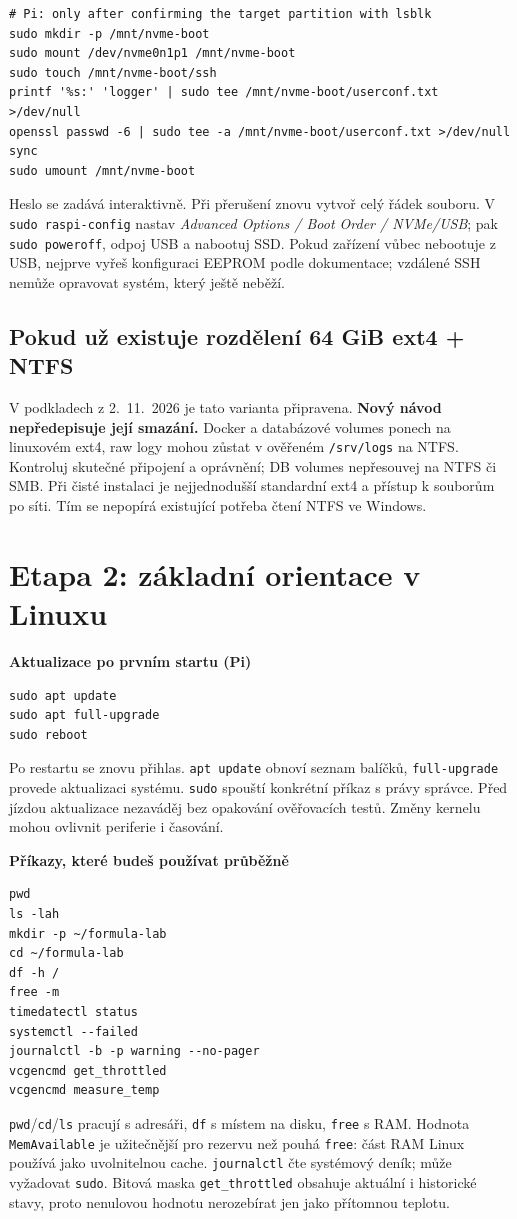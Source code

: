 \documentclass[11pt,a4paper]{article}
\newcommand{\krok}[1]{\par\noindent\textbf{#1}\par}
\begin{document}
\begin{lstlisting}
# Pi: only after confirming the target partition with lsblk
sudo mkdir -p /mnt/nvme-boot
sudo mount /dev/nvme0n1p1 /mnt/nvme-boot
sudo touch /mnt/nvme-boot/ssh
printf '%s:' 'logger' | sudo tee /mnt/nvme-boot/userconf.txt >/dev/null
openssl passwd -6 | sudo tee -a /mnt/nvme-boot/userconf.txt >/dev/null
sync
sudo umount /mnt/nvme-boot
\end{lstlisting}
Heslo se zadává interaktivně. Při přerušení znovu vytvoř celý řádek souboru. V \texttt{sudo raspi-config} nastav \emph{Advanced Options / Boot Order / NVMe/USB}; pak \texttt{sudo poweroff}, odpoj USB a nabootuj SSD. Pokud zařízení vůbec nebootuje z USB, nejprve vyřeš konfiguraci EEPROM podle dokumentace; vzdálené SSH nemůže opravovat systém, který ještě neběží.\cite{pi-config}

\subsection{Pokud už existuje rozdělení 64 GiB ext4 + NTFS}
V podkladech z 2.~11.~2026 je tato varianta připravena. \textbf{Nový návod nepředepisuje její smazání.} Docker a databázové volumes ponech na linuxovém ext4, raw logy mohou zůstat v ověřeném \texttt{/srv/logs} na NTFS. Kontroluj skutečné připojení a oprávnění; DB volumes nepřesouvej na NTFS či SMB. Při čisté instalaci je nejjednodušší standardní ext4 a přístup k souborům po síti. Tím se nepopírá existující potřeba čtení NTFS ve Windows.\cite{ntfs-priprava}

\clearpage
\section{Etapa 2: základní orientace v Linuxu}
\krok{Aktualizace po prvním startu (Pi)}
\begin{lstlisting}
sudo apt update
sudo apt full-upgrade
sudo reboot
\end{lstlisting}
Po restartu se znovu přihlas. \texttt{apt update} obnoví seznam balíčků, \texttt{full-upgrade} provede aktualizaci systému. \texttt{sudo} spouští konkrétní příkaz s právy správce. Před jízdou aktualizace nezaváděj bez opakování ověřovacích testů. Změny kernelu mohou ovlivnit periferie i časování.

\krok{Příkazy, které budeš používat průběžně}
\begin{lstlisting}
pwd
ls -lah
mkdir -p ~/formula-lab
cd ~/formula-lab
df -h /
free -m
timedatectl status
systemctl --failed
journalctl -b -p warning --no-pager
vcgencmd get_throttled
vcgencmd measure_temp
\end{lstlisting}
\texttt{pwd}/\texttt{cd}/\texttt{ls} pracují s adresáři, \texttt{df} s místem na disku, \texttt{free} s RAM. Hodnota \texttt{MemAvailable} je užitečnější pro rezervu než pouhá \texttt{free}: část RAM Linux používá jako uvolnitelnou cache. \texttt{journalctl} čte systémový deník; může vyžadovat \texttt{sudo}. Bitová maska \texttt{get\_throttled} obsahuje aktuální i historické stavy, proto nenulovou hodnotu nerozebírat jen jako přítomnou teplotu.\cite{pi-config}
\end{document}

